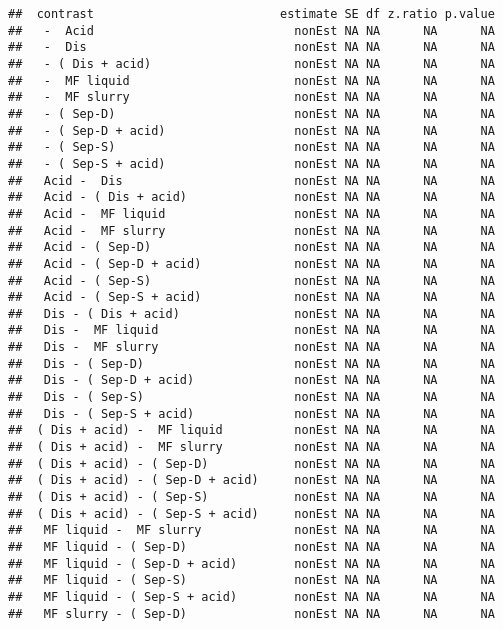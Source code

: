 \documentclass[
]{article}
\begin{document}
\begin{verbatim}
##  contrast                          estimate SE df z.ratio p.value
##   -  Acid                            nonEst NA NA      NA      NA
##   -  Dis                             nonEst NA NA      NA      NA
##   - ( Dis + acid)                    nonEst NA NA      NA      NA
##   -  MF liquid                       nonEst NA NA      NA      NA
##   -  MF slurry                       nonEst NA NA      NA      NA
##   - ( Sep-D)                         nonEst NA NA      NA      NA
##   - ( Sep-D + acid)                  nonEst NA NA      NA      NA
##   - ( Sep-S)                         nonEst NA NA      NA      NA
##   - ( Sep-S + acid)                  nonEst NA NA      NA      NA
##   Acid -  Dis                        nonEst NA NA      NA      NA
##   Acid - ( Dis + acid)               nonEst NA NA      NA      NA
##   Acid -  MF liquid                  nonEst NA NA      NA      NA
##   Acid -  MF slurry                  nonEst NA NA      NA      NA
##   Acid - ( Sep-D)                    nonEst NA NA      NA      NA
##   Acid - ( Sep-D + acid)             nonEst NA NA      NA      NA
##   Acid - ( Sep-S)                    nonEst NA NA      NA      NA
##   Acid - ( Sep-S + acid)             nonEst NA NA      NA      NA
##   Dis - ( Dis + acid)                nonEst NA NA      NA      NA
##   Dis -  MF liquid                   nonEst NA NA      NA      NA
##   Dis -  MF slurry                   nonEst NA NA      NA      NA
##   Dis - ( Sep-D)                     nonEst NA NA      NA      NA
##   Dis - ( Sep-D + acid)              nonEst NA NA      NA      NA
##   Dis - ( Sep-S)                     nonEst NA NA      NA      NA
##   Dis - ( Sep-S + acid)              nonEst NA NA      NA      NA
##  ( Dis + acid) -  MF liquid          nonEst NA NA      NA      NA
##  ( Dis + acid) -  MF slurry          nonEst NA NA      NA      NA
##  ( Dis + acid) - ( Sep-D)            nonEst NA NA      NA      NA
##  ( Dis + acid) - ( Sep-D + acid)     nonEst NA NA      NA      NA
##  ( Dis + acid) - ( Sep-S)            nonEst NA NA      NA      NA
##  ( Dis + acid) - ( Sep-S + acid)     nonEst NA NA      NA      NA
##   MF liquid -  MF slurry             nonEst NA NA      NA      NA
##   MF liquid - ( Sep-D)               nonEst NA NA      NA      NA
##   MF liquid - ( Sep-D + acid)        nonEst NA NA      NA      NA
##   MF liquid - ( Sep-S)               nonEst NA NA      NA      NA
##   MF liquid - ( Sep-S + acid)        nonEst NA NA      NA      NA
##   MF slurry - ( Sep-D)               nonEst NA NA      NA      NA

\end{verbatim}
\end{document}
